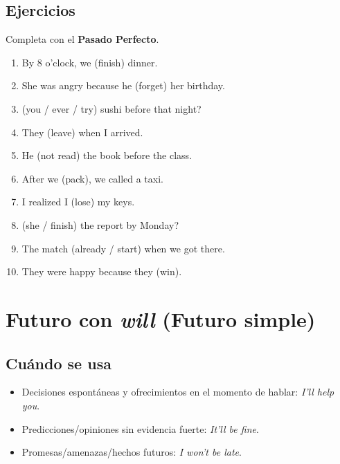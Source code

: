 \documentclass[11pt,a4paper]{article}
\begin{document}
\subsection*{Ejercicios}
Completa con el \textbf{Pasado Perfecto}.
\begin{enumerate}
  \item By 8 o’clock, we \underline{\hspace{2.5cm}} (finish) dinner.
  \item She was angry because he \underline{\hspace{2.5cm}} (forget) her birthday.
  \item \underline{\hspace{2.5cm}} (you / ever / try) sushi before that night?
  \item They \underline{\hspace{2.5cm}} (leave) when I arrived.
  \item He \underline{\hspace{2.5cm}} (not read) the book before the class.
  \item After we \underline{\hspace{2.5cm}} (pack), we called a taxi.
  \item I realized I \underline{\hspace{2.5cm}} (lose) my keys.
  \item \underline{\hspace{2.5cm}} (she / finish) the report by Monday?
  \item The match \underline{\hspace{2.5cm}} (already / start) when we got there.
  \item They were happy because they \underline{\hspace{2.5cm}} (win).
\end{enumerate}

\section{Futuro con \emph{will} (Futuro simple)}
\subsection*{Cuándo se usa}
\begin{itemize}
  \item Decisiones espontáneas y ofrecimientos en el momento de hablar: \emph{I’ll help you}.
  \item Predicciones/opiniones sin evidencia fuerte: \emph{It’ll be fine}.
  \item Promesas/amenazas/hechos futuros: \emph{I won’t be late}.
\end{itemize}
\end{document}
